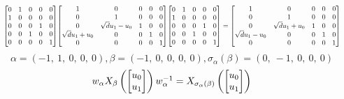 \documentclass[11pt]{article}
\theoremstyle{definition}
\begin{document}
\[
\scaletoalign{\textwidth}{{\left[\begin{matrix}0 & 1 & 0 & 0 & 0\\1 & 0 & 0 & 0 & 0\\0 & 0 & 0 & 1 & 0\\0 & 0 & 1 & 0 & 0\\0 & 0 & 0 & 0 & 1\end{matrix}\right]} {\left[\begin{matrix}1 & 0 & 0 & 0 & 0\\0 & 1 & 0 & 0 & 0\\0 & \sqrt{d} u_{1} - u_{0} & 1 & 0 & 0\\\sqrt{d} u_{1} + u_{0} & 0 & 0 & 1 & 0\\0 & 0 & 0 & 0 & 1\end{matrix}\right]} {\left[\begin{matrix}0 & 1 & 0 & 0 & 0\\1 & 0 & 0 & 0 & 0\\0 & 0 & 0 & 1 & 0\\0 & 0 & 1 & 0 & 0\\0 & 0 & 0 & 0 & 1\end{matrix}\right]} = {\left[\begin{matrix}1 & 0 & 0 & 0 & 0\\0 & 1 & 0 & 0 & 0\\0 & \sqrt{d} u_{1} + u_{0} & 1 & 0 & 0\\\sqrt{d} u_{1} - u_{0} & 0 & 0 & 1 & 0\\0 & 0 & 0 & 0 & 1\end{matrix}\right]}}
\]
\[
\alpha = \left( -1, \  1, \  0, \  0, \  0\right), \beta = \left( -1, \  0, \  0, \  0, \  0\right), \sigma_{\alpha}(\beta) = \left( 0, \  -1, \  0, \  0, \  0\right)
\]
\[
\scaletoalign{\textwidth}{w_{\alpha} X_{\beta}\left(\left[\begin{matrix}u_{0}\\u_{1}\end{matrix}\right]\right) w_{\alpha}^{-1} = X_{\sigma_{\alpha}\left(\beta\right)}\left(\left[\begin{matrix}u_{0}\\u_{1}\end{matrix}\right]\right)}
\]
\end{document}
